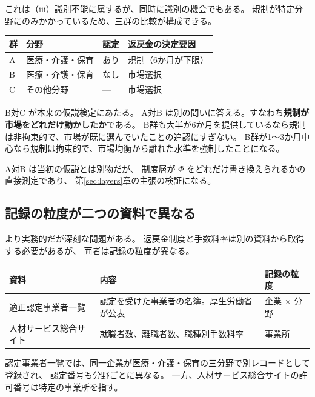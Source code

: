 これは（iii）識別不能に属するが、同時に識別の機会でもある。
規制が特定分野にのみかかっているため、三群の比較が構成できる。

\begin{center}
\begin{tabular}{@{}llll@{}}
\toprule
群 & 分野 & 認定 & 返戻金の決定要因 \\
\midrule
A & 医療・介護・保育 & あり & 規制（6か月が下限） \\
B & 医療・介護・保育 & なし & 市場選択 \\
C & その他分野 & --- & 市場選択 \\
\bottomrule
\end{tabular}
\label{tab:predB-groups}
\end{center}

B対C が本来の仮説検定にあたる。
A対B は別の問いに答える。すなわち\textbf{規制が市場をどれだけ動かしたか}である。
B群も大半が6か月を提供しているなら規制は非拘束的で、市場が既に選んでいたことの追認にすぎない。
B群が1〜3か月中心なら規制は拘束的で、市場均衡から離れた水準を強制したことになる。

A対B は当初の仮説とは別物だが、
制度層が $\Phi$ をどれだけ書き換えられるかの直接測定であり、
第\ref{sec:layers}章の主張の検証になる。

\subsection{記録の粒度が二つの資料で異なる}
\label{sec:unit-mismatch}

より実務的だが深刻な問題がある。
返戻金制度と手数料率は別の資料から取得する必要があるが、
両者は記録の粒度が異なる。

\begin{center}
\begin{tabularx}{\textwidth}{@{}lXl@{}}
\toprule
資料 & 内容 & 記録の粒度 \\
\midrule
適正認定事業者一覧 & 認定を受けた事業者の名簿。厚生労働省が公表 & 企業 $\times$ 分野 \\
人材サービス総合サイト & 就職者数、離職者数、職種別手数料率 & 事業所 \\
\bottomrule
\end{tabularx}
\label{tab:record-granularity}
\end{center}

認定事業者一覧では、同一企業が医療・介護・保育の三分野で別レコードとして登録され、
認定番号も分野ごとに異なる。
一方、人材サービス総合サイトの許可番号は特定の事業所を指す。

